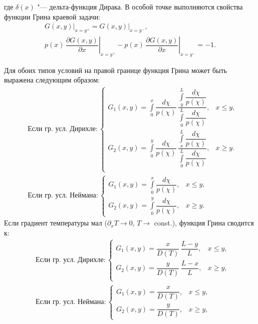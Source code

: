 где \( \delta(x) \) "--- дельта-функция Дирака. В особой точке выполняются свойства функции Грина краевой задачи:
\begin{equation}
    \label{eq:Green_problem_connect}
    \begin{gathered}
        \left.G(x,y)\right\vert_{x=y^+}=\left.G(x,y)\right\vert_{x=y^-}, \\
        \left.p(x)\,\dfrac{\partial G(x,y)}{\partial x}\right\vert_{x=y^+}-\left.p(x)\,\dfrac{\partial G(x,y)}{\partial x}\right\vert_{x=y^-}=-1.
    \end{gathered}
\end{equation}

Для обоих типов условий на правой границе функция Грина может быть выражена следующим образом:
\begin{subequations}
    \label{eq:Green_solution}
    \begin{align}
         & \text{Если гр. усл. Дирихле}:
        \begin{cases}
            G_1(x,y)=\int\limits_0^x\dfrac{d\chi}{p(\chi)}\,\dfrac{\int\limits_y^L\dfrac{d\chi}{p(\chi)}}{\int\limits_0^L\dfrac{d\chi}{p(\chi)}}, & x \leq y, \\[25pt]
            G_2(x,y)=\int\limits_0^y\dfrac{d\chi}{p(\chi)}\,\dfrac{\int\limits_x^L\dfrac{d\chi}{p(\chi)}}{\int\limits_0^L\dfrac{d\chi}{p(\chi)}}, & x \geq y. \\
        \end{cases}\label{eq:Green_solution_D} \\[10pt]
         & \text{Если гр. усл. Неймана}:
        \begin{cases}
            G_1(x,y)=\int\limits_0^x\dfrac{d\chi}{p(\chi)}, & x \leq y, \\[10pt]
            G_2(x,y)=\int\limits_0^y\dfrac{d\chi}{p(\chi)}, & x \geq y.
        \end{cases}\label{eq:Green_solution_N}
    \end{align}
\end{subequations}
Если градиент температуры мал ($\partial_x T \rightarrow 0$, $T \rightarrow$ const.), функция Грина сводится к:
\begin{subequations}
    \begin{align}
         & \text{Если гр. усл. Дирихле}:
        \begin{cases}
            G_1(x,y)=\dfrac{x}{D(T)}\,\dfrac{L-y}{L}, & x \leq y, \\[25pt]
            G_2(x,y)=\dfrac{y}{D(T)}\,\dfrac{L-x}{L}, & x \geq y, \\
        \end{cases} \\[10pt]
         & \text{Если гр. усл. Неймана}:
        \begin{cases}
            G_1(x,y)=\dfrac{x}{D(T)}, & x \leq y, \\[10pt]
            G_2(x,y)=\dfrac{y}{D(T)}, & x \geq y,
        \end{cases}
    \end{align}
\end{subequations}
